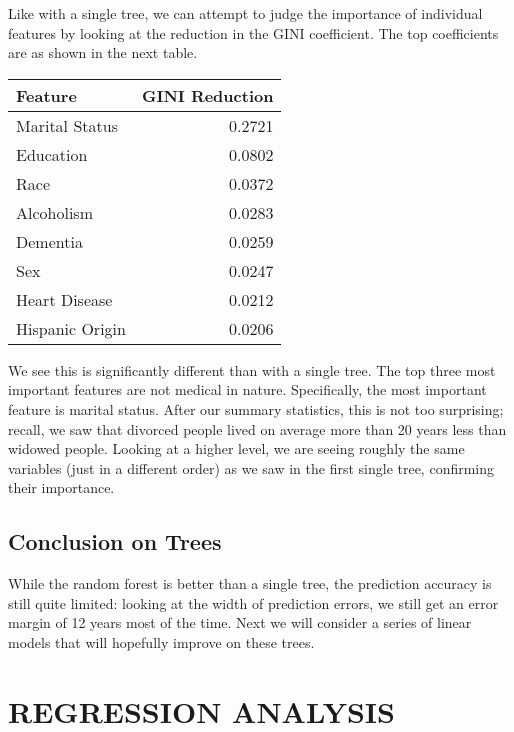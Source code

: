 \documentclass[letterpaper, 10 pt, conference]{ieeeconf}  %
\begin{document}
Like with a single tree, we can attempt to judge the importance of individual features by looking at the reduction in the GINI coefficient. The top coefficients are as shown in the next table.
\begin{table}[ht]
\begin{center}
\begin{tabular}{lr}
\toprule
            Feature &    GINI Reduction \\
\midrule
Marital Status	&  0.2721		\\
Education		&  0.0802		\\
Race			&  0.0372		\\
Alcoholism		& 0.0283		\\
Dementia		& 0.0259		\\
Sex				&  0.0247		\\
Heart Disease	&  0.0212		\\
Hispanic Origin	& 0.0206		\\
\bottomrule
\end{tabular}
\end{center}
\end{table}
We see this is significantly different than with a single tree. The top three most important features are not medical in nature. Specifically, the most important feature is marital status. After our summary statistics, this is not too surprising; recall, we saw that divorced people lived on average more than 20 years less than widowed people. Looking at a higher level, we are seeing roughly the same variables (just in a different order) as we saw in the first single tree, confirming their importance.


\subsection{Conclusion on Trees}
While the random forest is better than a single tree, the prediction accuracy is still quite limited: looking at the width of prediction errors, we still get an error margin of 12 years most of the time. Next we will consider a series of linear models that will hopefully improve on these trees. 

\section{REGRESSION ANALYSIS}
\end{document}
